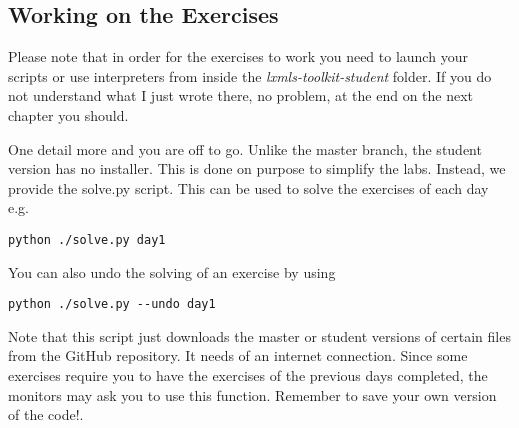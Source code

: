 \subsection{Working on the Exercises}

Please note that in order for the exercises to work you need to launch your scripts or use interpreters from inside the  \textit{lxmls-toolkit-student} folder. If you do not understand what I just wrote there, no problem, at the end on the next chapter you should.

One detail more and you are off to go. Unlike the master branch, the student version has no installer. This is done on purpose to simplify the labs. Instead, we provide the solve.py script. This can be used to solve the exercises of each day e.g.

\begin{verbatim}
python ./solve.py day1
\end{verbatim}

\noindent You can also undo the solving of an exercise by using

\begin{verbatim}
python ./solve.py --undo day1
\end{verbatim}

Note that this script just downloads the master or student versions of certain files from the GitHub repository. It needs of an internet connection. Since some exercises require you to have the exercises of the previous days completed, the monitors may ask you to use this function. Remember to save your own version of the code!. 

